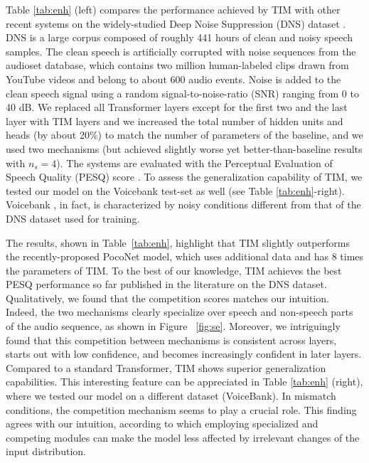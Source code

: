 \documentclass{article}
\begin{document}
Table \ref{tab:enh} (left) compares the performance achieved by TIM with other recent systems on the widely-studied Deep Noise Suppression (DNS) dataset \citep{reddy2020interspeech}. DNS is a large corpus composed of roughly 441 hours of clean and noisy speech samples. The clean speech is artificially corrupted with noise sequences from the audioset database, which contains two million human-labeled clips drawn from YouTube videos and belong to about 600 audio events. Noise is added to the clean speech signal using a random signal-to-noise-ratio (SNR) ranging from 0 to 40 dB. We replaced all Transformer layers except for the first two and the last layer with TIM layers and we increased the total number of hidden units and heads (by about 20\%) to match the number of parameters of the baseline, and we used two mechanisms (but achieved slightly worse yet better-than-baseline results with $n_s=4$). The systems are evaluated with the Perceptual Evaluation of Speech Quality (PESQ) score \citep{rix2001perceptual}. To assess the generalization capability of TIM, we tested our model on the Voicebank test-set as well (see Table \ref{tab:enh}-right). Voicebank  \citep{thiemann2013diverse}, in fact, is characterized by noisy conditions different from that of the DNS dataset used for training.  

The results, shown in Table~\ref{tab:enh}, highlight that TIM slightly outperforms the recently-proposed PocoNet \citep{hu2020dccrn} model, which uses additional data and has 8 times the parameters of TIM. 
To the best of our knowledge, TIM achieves the best PESQ performance so far published in the literature on the DNS dataset.
Qualitatively, we found that the competition scores matches our intuition. Indeed, the two mechanisms clearly specialize over speech and non-speech parts of the audio sequence, as shown in Figure ~\ref{fig:se}. Moreover, we intriguingly found that this competition between mechanisms is consistent across layers, starts out with low confidence, and becomes increasingly confident in later layers.
Compared to a standard Transformer, TIM shows superior generalization capabilities. This interesting feature can be appreciated in Table \ref{tab:enh} (right), where we tested our model on a different dataset (VoiceBank). In mismatch conditions, the competition mechanism seems to play a crucial role. 
This finding agrees with our intuition, according to which employing specialized and competing modules can make the model less affected by irrelevant changes of the input distribution. 
\end{document}
